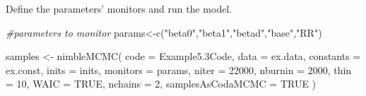 \documentclass[
]{book}
\newenvironment{Shaded}{\begin{snugshade}}{\end{snugshade}}
\newcommand{\AttributeTok}[1]{\textcolor[rgb]{0.77,0.63,0.00}{#1}}
\newcommand{\CommentTok}[1]{\textcolor[rgb]{0.56,0.35,0.01}{\textit{#1}}}
\newcommand{\ConstantTok}[1]{\textcolor[rgb]{0.00,0.00,0.00}{#1}}
\newcommand{\ControlFlowTok}[1]{\textcolor[rgb]{0.13,0.29,0.53}{\textbf{#1}}}
\newcommand{\DecValTok}[1]{\textcolor[rgb]{0.00,0.00,0.81}{#1}}
\newcommand{\FloatTok}[1]{\textcolor[rgb]{0.00,0.00,0.81}{#1}}
\newcommand{\FunctionTok}[1]{\textcolor[rgb]{0.00,0.00,0.00}{#1}}
\newcommand{\NormalTok}[1]{#1}
\newcommand{\OtherTok}[1]{\textcolor[rgb]{0.56,0.35,0.01}{#1}}
\newcommand{\SpecialCharTok}[1]{\textcolor[rgb]{0.00,0.00,0.00}{#1}}
\newcommand{\StringTok}[1]{\textcolor[rgb]{0.31,0.60,0.02}{#1}}
\begin{document}
\begin{Shaded}
\end{Shaded}

Define the parameters' monitors and run the model.

\begin{Shaded}
\begin{Highlighting}[]
\CommentTok{\#parameters to monitor}
\NormalTok{params}\OtherTok{\textless{}{-}}\FunctionTok{c}\NormalTok{(}\StringTok{"beta0"}\NormalTok{,}\StringTok{"beta1"}\NormalTok{,}\StringTok{"betad"}\NormalTok{,}\StringTok{"base"}\NormalTok{,}\StringTok{"RR"}\NormalTok{)}

\NormalTok{samples }\OtherTok{\textless{}{-}} \FunctionTok{nimbleMCMC}\NormalTok{(}
  \AttributeTok{code =}\NormalTok{ Example5}\FloatTok{.3}\NormalTok{Code,}
  \AttributeTok{data =}\NormalTok{ ex.data,}
  \AttributeTok{constants =}\NormalTok{ ex.const,}
  \AttributeTok{inits =}\NormalTok{ inits,}
  \AttributeTok{monitors =}\NormalTok{ params,}
  \AttributeTok{niter =} \DecValTok{22000}\NormalTok{,}
  \AttributeTok{nburnin =} \DecValTok{2000}\NormalTok{,}
  \AttributeTok{thin =} \DecValTok{10}\NormalTok{,}
  \AttributeTok{WAIC =} \ConstantTok{TRUE}\NormalTok{,}
  \AttributeTok{nchains =} \DecValTok{2}\NormalTok{,}
  \AttributeTok{samplesAsCodaMCMC =} \ConstantTok{TRUE}
\NormalTok{)}
\end{Highlighting}
\end{Shaded}
\end{document}
